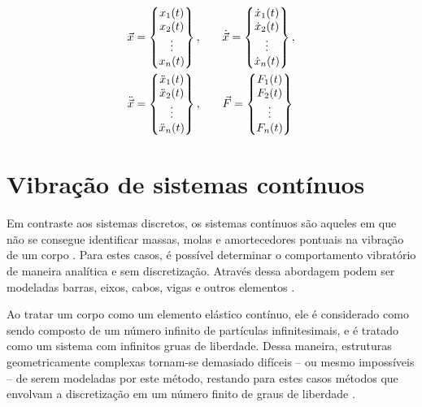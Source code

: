 \documentclass[12pt,oneside,english,brazil,lmodern,siglas,simbolos,cite=num]{ucsmonograph}
\begin{document}
	\begin{align} \label{eqn:vetores}
		\vec{x} =
		\begin{Bmatrix}
			x_1(t)\\ x_2(t)\\ \vdots\\ x_n(t)\\
		\end{Bmatrix},\qquad &
		\dot{\vec{x}} = 
		\begin{Bmatrix}
			\dot{x}_1(t)\\ \dot{x}_2(t)\\ \vdots\\ \dot{x}_n(t)\\
		\end{Bmatrix}, \notag\\
		\ddot{\vec{x}} = 
		\begin{Bmatrix}
			\ddot{x}_1(t)\\ \ddot{x}_2(t)\\ \vdots \\ \ddot{x}_n(t)\\  
		\end{Bmatrix},\qquad &
		\vec{F} = 
		\begin{Bmatrix}
			F_1(t)\\ F_2(t)\\ \vdots\\ F_n(t)\\
		\end{Bmatrix}
	\end{align}
	
	\section{Vibração de sistemas contínuos}
	Em contraste aos sistemas discretos, os sistemas contínuos são aqueles em que não se consegue identificar massas, molas e amortecedores pontuais na vibração de um corpo \cite{rao:2008}.
	Para estes casos, é possível determinar o comportamento vibratório de maneira analítica e sem discretização.
	Através dessa abordagem podem ser modeladas barras, eixos, cabos, vigas e outros elementos \cite{timoshenko:1974}.
	
	Ao tratar um corpo como um elemento elástico contínuo, ele é considerado como sendo composto de um número infinito de partículas infinitesimais, e é tratado como um sistema com infinitos gruas de liberdade.
	Dessa maneira, estruturas geometricamente complexas tornam-se demasiado difíceis -- ou mesmo impossíveis -- de serem modeladas por este método, restando para estes casos métodos que envolvam a discretização em um número finito de graus de liberdade \cite{timoshenko:1974}.
	
\end{document}
